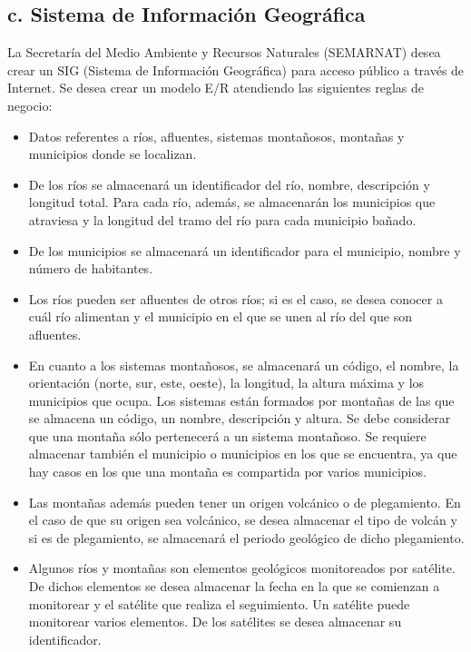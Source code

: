 \subsection*{c. Sistema de Información Geográfica}


\noindent La Secretaría del Medio Ambiente y Recursos Naturales (SEMARNAT) desea crear un SIG (Sistema de Información Geográfica) para acceso público a través de Internet. Se desea crear un modelo E/R atendiendo las siguientes reglas de negocio:

\begin{itemize}
    \item Datos referentes a ríos, afluentes, sistemas montañosos, montañas y municipios donde se localizan.
    
    \item De los ríos se almacenará un identificador del río, nombre, descripción y longitud total. Para cada río, además, se almacenarán los municipios que atraviesa y la longitud del tramo del río para cada municipio bañado.
    
    \item De los municipios se almacenará un identificador para el municipio, nombre y número de habitantes.
    
    \item Los ríos pueden ser afluentes de otros ríos; si es el caso, se desea conocer a cuál río alimentan y el municipio en el que se unen al río del que son afluentes.
    
    \item En cuanto a los sistemas montañosos, se almacenará un código, el nombre, la orientación (norte, sur, este, oeste), la longitud, la altura máxima y los municipios que ocupa. Los sistemas están formados por montañas de las que se almacena un código, un nombre, descripción y altura. Se debe considerar que una montaña sólo pertenecerá a un sistema montañoso. Se requiere almacenar también el municipio o municipios en los que se encuentra, ya que hay casos en los que una montaña es compartida por varios municipios.
    
    \item Las montañas además pueden tener un origen volcánico o de plegamiento. En el caso de que su origen sea volcánico, se desea almacenar el tipo de volcán y si es de plegamiento, se almacenará el periodo geológico de dicho plegamiento.
    
    \item Algunos ríos y montañas son elementos geológicos monitoreados por satélite. De dichos elementos se desea almacenar la fecha en la que se comienzan a monitorear y el satélite que realiza el seguimiento. Un satélite puede monitorear varios elementos. De los satélites se desea almacenar su identificador.
\end{itemize}



